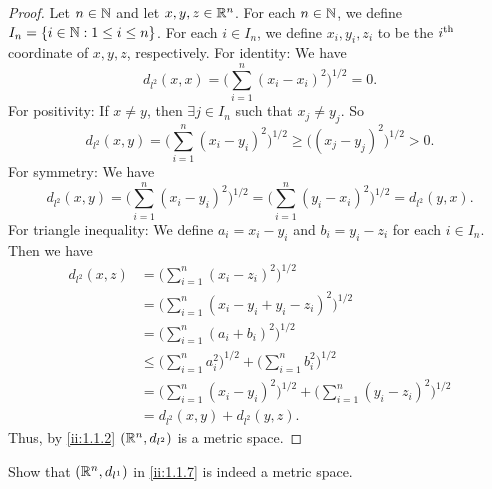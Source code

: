 \begin{proof}
  Let \(n \in \mathbb{N}\) and let \(x, y, z \in \mathbb{R}^n\).
  For each \(n \in \mathbb{N}\), we define \(I_n = \left\lbrace i \in \mathbb{N} : 1 \leq i \leq n\right\rbrace\).
  For each \(i \in I_n\), we define \(x_i, y_i, z_i\) to be the \(i^{\operatorname{th}}\) coordinate of \(x, y, z\), respectively.
  For identity:
  We have
  \[
    d_{l^2}(x, x) = \bigg(\sum_{i = 1}^n (x_i - x_i)^2\bigg)^{1 / 2} = 0.
  \]
  For positivity:
  If \(x \neq y\), then \(\exists j \in I_n\) such that \(x_j \neq y_j\).
  So
  \[
    d_{l^2}(x, y) = \bigg(\sum_{i = 1}^n (x_i - y_i)^2\bigg)^{1 / 2} \geq \big((x_j - y_j)^2\big)^{1 / 2} > 0.
  \]
  For symmetry:
  We have
  \[
    d_{l^2}(x, y) = \bigg(\sum_{i = 1}^n (x_i - y_i)^2\bigg)^{1 / 2} = \bigg(\sum_{i = 1}^n (y_i - x_i)^2\bigg)^{1 / 2} = d_{l^2}(y, x).
  \]
  For triangle inequality:
  We define \(a_i = x_i - y_i\) and \(b_i = y_i - z_i\) for each \(i \in I_n\).
  Then we have
  \begin{align*}
    d_{l^2}(x, z) & = \bigg(\sum_{i = 1}^n (x_i - z_i)^2\bigg)^{1 / 2}                                                    \\
                  & = \bigg(\sum_{i = 1}^n (x_i - y_i + y_i - z_i)^2\bigg)^{1 / 2}                                        \\
                  & = \bigg(\sum_{i = 1}^n (a_i + b_i)^2\bigg)^{1 / 2}                                                    \\
                  & \leq \bigg(\sum_{i = 1}^n a_i^2\bigg)^{1 / 2} + \bigg(\sum_{i = 1}^n b_i^2\bigg)^{1 / 2}              \\
                  & = \bigg(\sum_{i = 1}^n (x_i - y_i)^2\bigg)^{1 / 2} + \bigg(\sum_{i = 1}^n (y_i - z_i)^2\bigg)^{1 / 2} \\
                  & = d_{l^2}(x, y) + d_{l^2}(y, z).
  \end{align*}
  Thus, by \cref{ii:1.1.2} \((\mathbb{R}^n, d_{l^2})\) is a metric space.
\end{proof}

\begin{ex}\label{ii:ex:1.1.7}
  Show that \((\mathbb{R}^n, d_{l^1})\) in \cref{ii:1.1.7} is indeed a metric space.
\end{ex}


